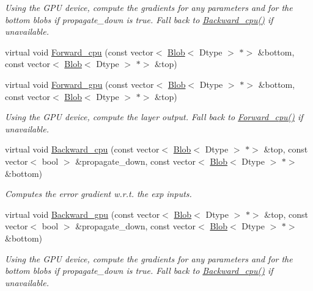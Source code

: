 \begin{DoxyCompactItemize}
\begin{DoxyCompactList}\small\item\em Using the G\+PU device, compute the gradients for any parameters and for the bottom blobs if propagate\+\_\+down is true. Fall back to \mbox{\hyperlink{classcaffe_1_1_log_layer_a79f6398d807b7d751820528d5a68faa7}{Backward\+\_\+cpu()}} if unavailable. \end{DoxyCompactList}\item 
virtual void \mbox{\hyperlink{classcaffe_1_1_log_layer_aeb9fead649bae76818f950a43382d0dc}{Forward\+\_\+cpu}} (const vector$<$ \mbox{\hyperlink{classcaffe_1_1_blob}{Blob}}$<$ Dtype $>$ $\ast$$>$ \&bottom, const vector$<$ \mbox{\hyperlink{classcaffe_1_1_blob}{Blob}}$<$ Dtype $>$ $\ast$$>$ \&top)
\item 
\mbox{\label{classcaffe_1_1_log_layer_a37ec5bf1dc1a00c1830ec92fcf22fe09}} 
virtual void \mbox{\hyperlink{classcaffe_1_1_log_layer_a37ec5bf1dc1a00c1830ec92fcf22fe09}{Forward\+\_\+gpu}} (const vector$<$ \mbox{\hyperlink{classcaffe_1_1_blob}{Blob}}$<$ Dtype $>$ $\ast$$>$ \&bottom, const vector$<$ \mbox{\hyperlink{classcaffe_1_1_blob}{Blob}}$<$ Dtype $>$ $\ast$$>$ \&top)
\begin{DoxyCompactList}\small\item\em Using the G\+PU device, compute the layer output. Fall back to \mbox{\hyperlink{classcaffe_1_1_log_layer_a407de9bdb364ed170a73c6eebc74dce9}{Forward\+\_\+cpu()}} if unavailable. \end{DoxyCompactList}\item 
virtual void \mbox{\hyperlink{classcaffe_1_1_log_layer_a89e1a1a60fca7d144afeee42aa996951}{Backward\+\_\+cpu}} (const vector$<$ \mbox{\hyperlink{classcaffe_1_1_blob}{Blob}}$<$ Dtype $>$ $\ast$$>$ \&top, const vector$<$ bool $>$ \&propagate\+\_\+down, const vector$<$ \mbox{\hyperlink{classcaffe_1_1_blob}{Blob}}$<$ Dtype $>$ $\ast$$>$ \&bottom)
\begin{DoxyCompactList}\small\item\em Computes the error gradient w.\+r.\+t. the exp inputs. \end{DoxyCompactList}\item 
\mbox{\label{classcaffe_1_1_log_layer_ac31070a5303ee3e4c04b01326cb0c40a}} 
virtual void \mbox{\hyperlink{classcaffe_1_1_log_layer_ac31070a5303ee3e4c04b01326cb0c40a}{Backward\+\_\+gpu}} (const vector$<$ \mbox{\hyperlink{classcaffe_1_1_blob}{Blob}}$<$ Dtype $>$ $\ast$$>$ \&top, const vector$<$ bool $>$ \&propagate\+\_\+down, const vector$<$ \mbox{\hyperlink{classcaffe_1_1_blob}{Blob}}$<$ Dtype $>$ $\ast$$>$ \&bottom)
\begin{DoxyCompactList}\small\item\em Using the G\+PU device, compute the gradients for any parameters and for the bottom blobs if propagate\+\_\+down is true. Fall back to \mbox{\hyperlink{classcaffe_1_1_log_layer_a79f6398d807b7d751820528d5a68faa7}{Backward\+\_\+cpu()}} if unavailable. \end{DoxyCompactList}\end{DoxyCompactItemize}
